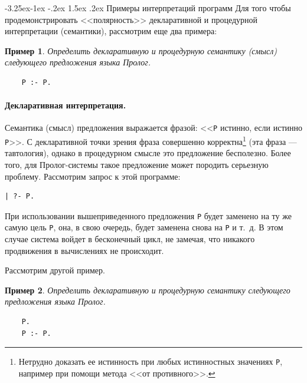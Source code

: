 \documentclass[12pt, openany, twoside]{book} %
\makeatletter
\newtheorem{example}{Пример}[chapter]
\renewcommand\subsection{\@startsection{subsection}{2}{\z@}%
                                     {-3.25ex\@plus -1ex \@minus -.2ex}%
                                     {1.5ex \@plus .2ex}%
                                     {\normalfont\normalsize\bfseries}}
\makeatother
\begin{document}
\subsection{Примеры интерпретаций программ}
Для того чтобы продемонстрировать <<полярность>> декларативной и процедурной интерпретации (семантики), рассмотрим еще два примера:

\begin{example}
Определить декларативную и процедурную семантику (смысл) следующего предложения языка Пролог.
\end{example}
{\tt\begin{verbatim}
    P :- P.
\end{verbatim}}

\paragraph{Декларативная интерпретация.}
\noindent Семантика (смысл) предложения выражается фразой: <<{\tt P} истинно, если истинно {\tt P}>>. С декларативной точки зрения фраза совершенно корректна\footnote{Нетрудно доказать ее истинность при любых истинностных значениях {\tt P}, например при помощи метода <<от противного>>.} (эта фраза --- тавтология),  однако в процедурном смысле это предложение бесполезно. Более того, для Пролог-системы такое предложение может породить серьезную проблему. Рассмотрим запрос к этой программе:
{\tt\begin{verbatim}
| ?- P.
\end{verbatim}}
\noindent При использовании вышеприведенного предложения {\tt P} будет заменено на ту же самую цель {\tt P}, она, в свою очередь, будет заменена снова на {\tt P} и т.~д. В этом случае система войдет в бесконечный цикл, не замечая, что никакого продвижения в вычислениях не происходит.

Рассмотрим другой пример.
\begin{example}
Определить декларативную и процедурную семантику следующего предложения языка Пролог.
\end{example}
{\tt\begin{verbatim}
    P.
    P :- P.
\end{verbatim}}
\end{document}
